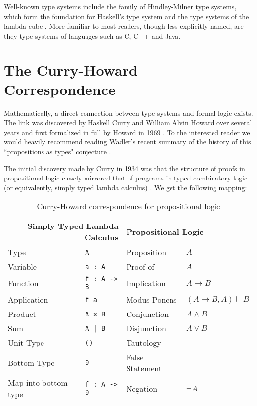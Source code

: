 Well-known type systems include the family of Hindley-Milner type systems, which form the foundation for Haskell's type system \cite{haskelldesignreport} and the type systems of the lambda cube \cite{barendregt:1991:lambdacube}. More familiar to most readers, though less explicitly named, are they type systems of languages such as C, C++ and Java.

\section{The Curry-Howard Correspondence}
Mathematically, a direct connection between type systems and formal logic exists. The link was discovered by Haskell Curry and William Alvin Howard over several years and first formalized in full by Howard in 1969 \cite{howard1969formulaeastypes}. To the interested reader we would heavily recommend reading Wadler's recent summary of the history of this ``propositions as types" conjecture \cite{wadler:2015:propositions}.

The initial discovery made by Curry in 1934 was that the structure of proofs in propositional logic closely mirrored that of programs in typed combinatory logic (or equivalently, simply typed lambda calculus) \cite{curry1934functionality}. We get the following mapping:

\begin{table}[H]
    \begin{center}
    \begin{tabular}{ll|ll}
                    \multicolumn{2}{r|}{\textbf{Simply Typed Lambda Calculus}}  & \multicolumn{2}{l}{\textbf{Propositional Logic}} \\ \hline
        Type        & \texttt{A}            & Proposition   & $A$ \\
        Variable    & \texttt{a : A}        & Proof of      & $A$ \\
        Function    & \texttt{f : A -> B}   & Implication   & $A \to B$ \\
        Application & \texttt{f a}          & Modus Ponens  & $(A \to B, A) \vdash B$ \\
        Product     & \texttt{A × B}        & Conjunction   & $A \land B$ \\
        Sum         & \texttt{A | B}        & Disjunction   & $A \lor B$ \\
        Unit Type   & \texttt{()}           & Tautology     & \\
        Bottom Type & \texttt{0}            & False Statement & \\
        Map into bottom type & \texttt{f : A -> 0}   & Negation       & $\lnot A$
    \end{tabular}
    \end{center}
\caption{Curry-Howard correspondence for propositional logic}
\label{tab:curryhowardprop}
\end{table}

